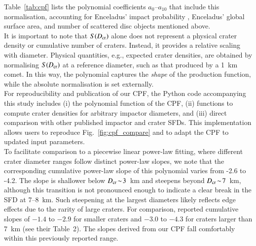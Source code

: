 \documentclass[preprint,11pt,3p,times,authoryear]{elsarticle}
\begin{document}
{Table~\ref{tab:cpf} lists the polynomial coefficients $a_{0}$–$a_{10}$ that include this normalisation, accounting for Enceladus’ impact probability \citep{Wong2023,Brasser2025}, Enceladus' global surface area, and number of scattered disc objects mentioned above.\\

It is important to note that $S(D_{\rm cr})$ alone does not represent a physical crater density or cumulative number of craters. Instead, it provides a relative scaling with diameter.
Physical quantities, e.g., expected crater densities, are obtained by normalising $S(D_{\rm cr})$ at a reference diameter, such as that produced by a 1~km comet.
In this way, the polynomial captures the \emph{shape} of the production function, while the absolute normalisation is set externally.\\

For reproducibility and publication of our CPF, the Python code accompanying this study includes (i) the polynomial function of the CPF, (ii) functions to compute crater densities for arbitrary impactor diameters, and (iii) direct comparison with other published impactor and crater SFDs. This implementation allows users to reproduce Fig.~\ref{fig:cpf_compare} and to adapt the CPF to updated input parameters.\\


To facilitate comparison to a piecewise linear power-law fitting, where different crater diameter ranges follow distinct power-law slopes, we note that the corresponding cumulative power-law slope of this polynomial varies from -2.6 to -4.2.
The slope is shallower below $D_{\rm cr}\!\sim\!3$~km and steepens beyond $D_{\rm cr}\!\sim\!7$~km, although this transition is not pronounced enough to indicate a clear break in the SFD at 7--8~km. Such steepening at the largest diameters likely reflects edge effects due to the rarity of large craters.
For comparison, \citet{Kirchoff2009} reported cumulative slopes of $-1.4$ to $-2.9$
for smaller craters and $-3.0$ to $-4.3$ for craters larger than 7~km (see their Table~2). The slopes derived from our CPF fall comfortably within this previously reported range.\\

}
\end{document}
